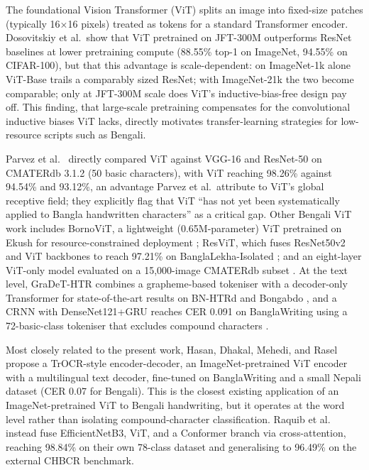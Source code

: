 The foundational Vision Transformer (ViT) \citep{ref22} splits an image
into fixed-size patches (typically 16×16 pixels) treated as tokens for a
standard Transformer encoder. Dosovitskiy et al.\ show that ViT
pretrained on JFT-300M outperforms ResNet baselines at lower
pretraining compute (88.55\% top-1 on ImageNet, 94.55\% on CIFAR-100),
but that this advantage is scale-dependent: on ImageNet-1k alone
ViT-Base trails a comparably sized ResNet; with ImageNet-21k the two
become comparable; only at JFT-300M scale does ViT's inductive-bias-free
design pay off. This finding, that large-scale pretraining compensates
for the convolutional inductive biases ViT lacks, directly motivates
transfer-learning strategies for low-resource scripts such as Bengali.

Parvez et al.~\citeyearpar{ref17} directly compared ViT against VGG-16
and ResNet-50 on CMATERdb 3.1.2 (50 basic characters), with ViT reaching
98.26\% against 94.54\% and 93.12\%, an advantage Parvez et al.\ attribute to ViT's global receptive field; they explicitly flag that ViT ``has not
yet been systematically applied to Bangla handwritten characters'' as a
critical gap. Other Bengali ViT work includes BornoViT, a lightweight
(0.65M-parameter) ViT pretrained on Ekush for resource-constrained
deployment \citep{ref18}; ResViT, which fuses ResNet50v2 and ViT
backbones to reach 97.21\% on BanglaLekha-Isolated \citep{ref19}; and an
eight-layer ViT-only model evaluated on a 15,000-image CMATERdb subset
\citep{ref38}. At the text level, GraDeT-HTR combines a grapheme-based
tokeniser with a decoder-only Transformer for state-of-the-art results
on BN-HTRd and Bongabdo \citep{ref20}, and a CRNN with DenseNet121+GRU
reaches CER 0.091 on BanglaWriting using a 72-basic-class tokeniser that
excludes compound characters \citep{ref39}.

Most closely related to the present work, Hasan, Dhakal, Mehedi, and
Rasel \citep{ref21} propose a TrOCR-style encoder-decoder, an
ImageNet-pretrained ViT encoder with a multilingual text decoder,
fine-tuned on BanglaWriting and a small Nepali dataset (CER 0.07 for
Bengali). This is the closest existing application of an
ImageNet-pretrained ViT to Bengali handwriting, but it operates at the
word level rather than isolating compound-character classification.
Raquib et al.~\citeyearpar{ref25} instead fuse EfficientNetB3, ViT, and a
Conformer branch via cross-attention, reaching 98.84\% on their own
78-class dataset and generalising to 96.49\% on the external CHBCR
benchmark.

